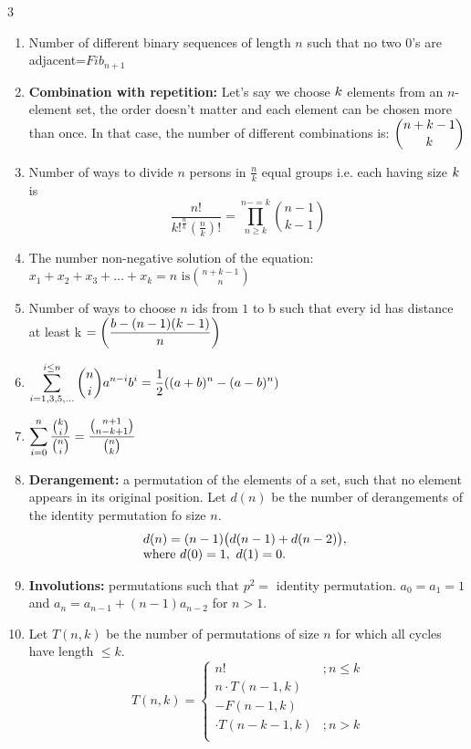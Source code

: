 \documentclass[8pt,a4paper,onesided]{article}
\begin{document}
\begin{multicols}{3}
\begin{enumerate}
    \item Number of different binary sequences of length $n$ such that no two $0$’s are adjacent=$\displaystyle Fib_{n+1}$
    \item \textbf{Combination with repetition:} Let’s say we choose $\displaystyle \displaystyle k$ elements from an $n$-element set, the order doesn’t matter and each element can be chosen more than once. In that case, the number of different combinations is: $\displaystyle \displaystyle {n+k-1 \choose k}$
    \item Number of ways to divide $n$ persons in $\displaystyle \frac{n}{k}$ equal groups i.e. each having size $\displaystyle \displaystyle k$ is
    \[\displaystyle \frac{n!}{k!^{\frac{n}{k}} \left( \frac{n}{k} \right) !}= \prod \limits_{n \geq k}^{n-=k}{n-1 \choose k-1}\]
    \item The number non-negative solution of the equation: $\displaystyle x_1+x_2+x_3+\dots+x_k=n \text{ is}{n+k-1 \choose n}$
    \item Number of ways to choose $n$ ids from $\displaystyle 1$ to b such that every id has distance at least k $\displaystyle \displaystyle =\left( \frac{b-(n-1)(k-1)}{n} \right)$
    \item $\displaystyle \displaystyle \sum \limits_{i=1,3,5,\dots}^{i\leq n} \binom{n}{i} a^{n-i}b^i = \frac{1}{2} ((a+b)^n-(a-b)^n)$
    \item $\displaystyle \displaystyle \sum \limits_{i=0}^{n} \dfrac{\binom{k}{i}}{\binom{n}{i}} = \dfrac{\binom{n+1}{n-k+1}}{\binom{n}{k}}$
    \item \textbf{Derangement:} a permutation of the elements of a set, such that no element appears in its original position. Let $d(n)$ be the number of derangements of the identity permutation fo size $n$.
    \[\begin{array}{@{}l}d(n) = (n - 1)\bigl(d(n - 1) + d(n - 2)\bigr),\\ \text{where } d(0)=1,\ d(1)=0.\end{array}\]
    \item \textbf{Involutions:} permutations such that $\displaystyle p^2 =$ identity permutation. $\displaystyle a_0 = a_1 = 1$ and $\displaystyle a_n=a_{n-1} + (n-1)a_{n-2}$ for $n>1$.
    \item Let $T(n,k)$ be the number of permutations of size $n$ for which all cycles have length $\displaystyle \leq k$.
    \[T(n, k)=
    \begin{cases}
      n! & ; n \le k\\
      n \cdot T(n-1, k) \\ - F(n-1, k) \\ \cdot T(n-k-1, k) & ;n > k \\

\end{cases}\]
\end{enumerate}
\end{multicols}
\end{document}
